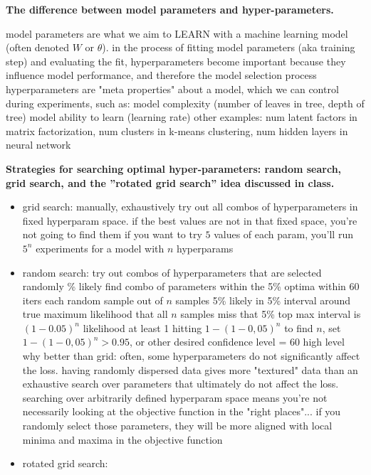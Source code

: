\documentclass[10pt,letterpaper]{article}
\begin{document}
\subitem \textbf{ The difference between model parameters and hyper-parameters.}
\begin{solution}
model parameters are what we aim to LEARN with a machine learning model (often denoted $W$ or $\theta$). in the process of fitting model parameters (aka training step) and evaluating the fit, hyperparameters become important because they influence model performance, and therefore the model selection process 
\newline
hyperparameters are "meta properties" about a model, which we can control during experiments, such as:
\subitem model complexity (number of leaves in tree, depth of tree)
\subitem model ability to learn (learning rate)
\subitem other examples: num latent factors in matrix factorization, num clusters in k-means clustering, num hidden layers in neural network
\end{solution}

\subitem \textbf{ Strategies for searching optimal hyper-parameters: random search, grid search, and the ”rotated grid search” idea discussed in class.}
\begin{solution}
\begin{itemize}
\item grid search: manually, exhaustively try out all combos of hyperparameters in fixed hyperparam space. 
\subitem if the best values are not in that fixed space, you're not going to find them
\subitem if you want to try $5$ values of each param, you'll run $5^n$ experiments for a model with $n$ hyperparams
\item random search: try out combos of hyperparameters that are selected randomly
\% likely find combo of parameters within the 5\% optima within 60 iters 
\subsubitem each random sample out of $n$ samples 5\% likely in 5\% interval around true maximum
\subsubitem likelihood that all $n$ samples miss that 5\% top max interval is $(1-0.05)^n$
\subsubitem likelihood at least 1 hitting $1-(1-0,05)^n$
\subsubitem to find $n$, set  $1-(1-0,05)^n > 0.95$, or other desired confidence level = 60
\subitem high level why better than grid: often, some hyperparameters do not significantly affect the loss. having randomly dispersed data gives more "textured" data than an exhaustive search over parameters that ultimately do not affect the loss. searching over arbitrarily defined hyperparam space means you're not necessarily looking at the objective function in the "right places"... if you randomly select those parameters, they will be more aligned with local minima and maxima in the objective function
\item rotated grid search:
\end{itemize}
\end{solution}
\end{document}
